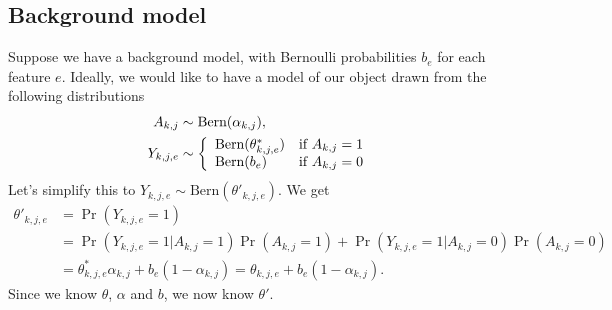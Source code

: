 \documentclass{article}
\newcommand{\Bern}[1]{\text{Bern}(#1)}
\begin{document}
\subsection{Background model}
Suppose we have a background model, with Bernoulli probabilities $b_e$ for each feature $e$. Ideally, we would like to have a model of our object drawn from the following distributions
\begin{align*}
    A_{k,j} & \sim \Bern{\alpha_{k,j}}, \\
    Y_{k,j,e} & \sim \left\{
        \begin{array}{l l}
            \Bern{\theta^*_{k,j,e}} & \text{if }A_{k,j} = 1  \\
            \Bern{b_e} & \text{if }A_{k,j} = 0 
        \end{array} \right.
\end{align*}
Let's simplify this to $Y_{k,j,e} \sim \Bern{\theta'_{k,j,e}}$. We get
\begin{align*}
    \theta'_{k,j,e} &= \Pr(Y_{k,j,e} = 1) \\
        &= \Pr(Y_{k,j,e}  = 1| A_{k,j} = 1) \Pr(A_{k,j} = 1) + \Pr(Y_{k,j,e} = 1| A_{k,j} = 0) \Pr(A_{k,j} = 0) \\
        &= \theta^*_{k,j,e} \alpha_{k,j} + b_e (1 - \alpha_{k,j}) = \theta_{k,j,e} + b_e (1 - \alpha_{k,j}).
\end{align*}
Since we know $\theta$, $\alpha$ and $b$, we now know $\theta'$.




\end{document}
